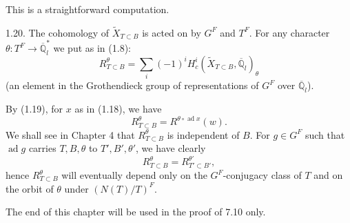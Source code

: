 \documentclass[9pt,twoside]{extarticle}
\begin{document}
{This is a straightforward computation.\par

1.20. The cohomology of \(\widetilde X_{T\subset B}\) is acted on by \(G^F\) and \(T^F\). For any character \(\theta:T^F\to\overline{\mathbb Q}_l^*\) we put as in (1.8): \[
R_{T\subset B}^{\theta}=\sum_i(-1)^iH_c^i(\widetilde X_{T\subset B},\overline{\mathbb Q}_l)_\theta
\] (an element in the Grothendieck group of representations of \(G^F\) over \(\overline{\mathbb Q}_l\)).\par

By (1.19), for \(x\) as in (1.18), we have \[
R_{T\subset B}^{\theta}=R^{\theta\circ\operatorname{ad}x}(w).
\] We shall see in Chapter 4 that \(R_{T\subset B}^{\theta}\) is independent of \(B\). For \(g\in G^F\) such that \(\operatorname{ad}g\) carries \(T,B,\theta\) to \(T',B',\theta'\), we have clearly \[
R_{T\subset B}^{\theta}=R_{T'\subset B'}^{\theta'},
\] hence \(R_{T\subset B}^{\theta}\) will eventually depend only on the \(G^F\)-conjugacy class of \(T\) and on the orbit of \(\theta\) under \((N(T)/T)^F\).\par

The end of this chapter will be used in the proof of 7.10 only.\par
}
\end{document}

